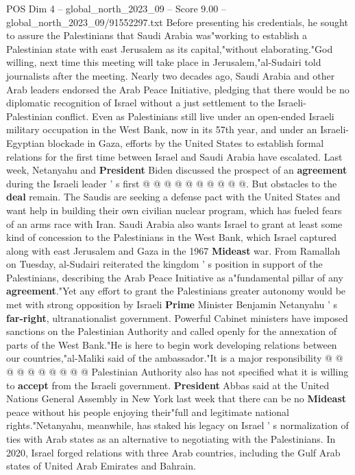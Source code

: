 \begin{textsample}{POS Dim 4 – global\_north\_2023\_09 – Score 9.00 – global\_north\_2023\_09/91552297.txt}
Before presenting his credentials, he sought to assure the Palestinians that Saudi Arabia was"working to establish a Palestinian state with east Jerusalem as its capital,"without elaborating."God willing, next time this meeting will take place in Jerusalem,"al-Sudairi told journalists after the meeting.
Nearly two decades ago, Saudi Arabia and other Arab leaders endorsed the Arab Peace Initiative, pledging that there would be no diplomatic recognition of Israel without a just settlement to the Israeli-Palestinian conflict.
Even as Palestinians still live under an open-ended Israeli military occupation in the West Bank, now in its 57th year, and under an Israeli-Egyptian blockade in Gaza, efforts by the United States to establish formal relations for the first time between Israel and Saudi Arabia have escalated.
Last week, Netanyahu and \textbf{President} Biden discussed the prospect of an \textbf{agreement} during the Israeli leader ' s first @ @ @ @ @ @ @ @ @ @.
But obstacles to the \textbf{deal} remain.
The Saudis are seeking a defense pact with the United States and want help in building their own civilian nuclear program, which has fueled fears of an arms race with Iran.
Saudi Arabia also wants Israel to grant at least some kind of concession to the Palestinians in the West Bank, which Israel captured along with east Jerusalem and Gaza in the 1967 \textbf{Mideast} war.
From Ramallah on Tuesday, al-Sudairi reiterated the kingdom ' s position in support of the Palestinians, describing the Arab Peace Initiative as a"fundamental pillar of any \textbf{agreement}."Yet any effort to grant the Palestinians greater autonomy would be met with strong opposition by Israeli \textbf{Prime} Minister Benjamin Netanyahu ' s \textbf{far-right}, ultranationalist government.
Powerful Cabinet ministers have imposed sanctions on the Palestinian Authority and called openly for the annexation of parts of the West Bank."He is here to begin work developing relations between our countries,"al-Maliki said of the ambassador."It is a major responsibility @ @ @ @ @ @ @ @ @ @ Palestinian Authority also has not specified what it is willing to \textbf{accept} from the Israeli government. \textbf{President} Abbas said at the United Nations General Assembly in New York last week that there can be no \textbf{Mideast} peace without his people enjoying their"full and legitimate national rights."Netanyahu, meanwhile, has staked his legacy on Israel ' s normalization of ties with Arab states as an alternative to negotiating with the Palestinians.
In 2020, Israel forged relations with three Arab countries, including the Gulf Arab states of United Arab Emirates and Bahrain.

\end{textsample}
